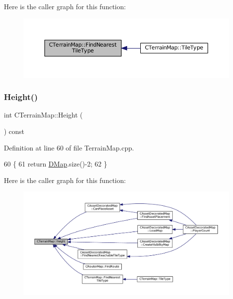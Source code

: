 Here is the caller graph for this function\+:\nopagebreak
\begin{figure}[H]
\begin{center}
\leavevmode
\includegraphics[width=350pt]{classCTerrainMap_af32811cace3a3b01c9519b304ddb8efc_icgraph}
\end{center}
\end{figure}
\hypertarget{classCTerrainMap_ae5e4bf6507e0e3e9ac0322b43eed8a7a}{}\label{classCTerrainMap_ae5e4bf6507e0e3e9ac0322b43eed8a7a} 
\subsubsection{\texorpdfstring{Height()}{Height()}}
{\footnotesize\ttfamily int C\+Terrain\+Map\+::\+Height (\begin{DoxyParamCaption}{ }\end{DoxyParamCaption}) const}



Definition at line 60 of file Terrain\+Map.\+cpp.


\begin{DoxyCode}
60                              \{
61     \textcolor{keywordflow}{return} \hyperlink{classCTerrainMap_a80d154ce478948b10473534a7bca13f6}{DMap}.size()-2;
62 \}
\end{DoxyCode}
Here is the caller graph for this function\+:\nopagebreak
\begin{figure}[H]
\begin{center}
\leavevmode
\includegraphics[width=350pt]{classCTerrainMap_ae5e4bf6507e0e3e9ac0322b43eed8a7a_icgraph}
\end{center}
\end{figure}
\hypertarget{classCTerrainMap_a620258ecf38afb6275c865dad4fc4af4}{}\label{classCTerrainMap_a620258ecf38afb6275c865dad4fc4af4} 
